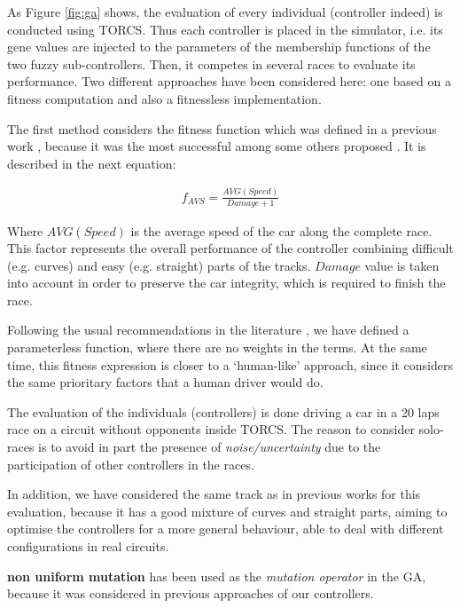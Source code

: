 \documentclass[10pt,journal,compsoc]{IEEEtran}
\begin{document}
As Figure \ref{fig:ga} shows, the evaluation of every individual (controller indeed) is conducted using TORCS. Thus each controller is placed in the simulator, i.e. its gene values are injected to the parameters of the membership functions of the two fuzzy sub-controllers. Then, it competes in several races to evaluate its performance.
Two different approaches have been considered here: one based on a fitness computation and also a fitnessless implementation.

The first method considers the fitness function which was defined in a previous work \cite{salem_cig2018}, because it was the most successful among some others proposed \cite{salem_evo18}. It is described in the next equation:

 \begin{equation} \label{fit2}
 	\begin{array}{lll}
 		f_{AVS}= \frac{AVG(Speed)}{Damage+1}
 	\end{array}
 \end{equation}	

Where $AVG(Speed)$ is the average speed of the car along the complete race. This factor represents the overall performance of the controller combining difficult (e.g. curves) and easy (e.g. straight) parts of the tracks. $Damage$ value is taken into account in order to preserve the car integrity, which is required to finish the race.

Following the usual recommendations in the literature \cite{Harik-ParameterLess99}, we have defined a parameterless function, where there are no weights in the terms.
At the same time, this fitness expression is closer to a `human-like' approach, since it considers the same prioritary factors that a human driver would do.

The evaluation of the individuals (controllers) is done driving a car in a 20 laps race on a circuit without opponents inside TORCS. The reason to consider solo-races is to avoid in part the presence of \textit{noise/uncertainty} due to the participation of other controllers \cite{merelo2016statistical} in the races.

In addition, we have considered the same track as in previous works
\cite{salem_cig2018} for this evaluation, because it has a good mixture of 
curves and straight parts, aiming to optimise the controllers for a more general behaviour, able to deal with different configurations in real circuits.

\textbf{non uniform mutation} \cite{mutation1997} has been used as the \textit{mutation operator} in the GA, because it was considered in previous approaches of our controllers. 
\end{document}
